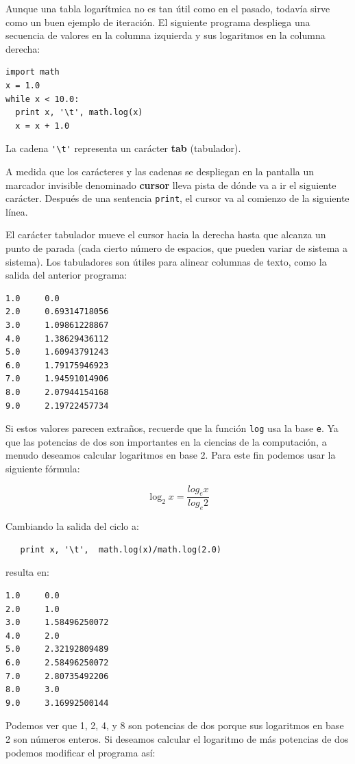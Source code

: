 
Aunque una tabla logarítmica no es tan útil como en el pasado, todavía
sirve como un buen ejemplo de iteración. El siguiente programa
despliega una secuencia de valores en la columna izquierda y sus
logaritmos en la columna derecha:

\beforeverb
\begin{verbatim}
import math
x = 1.0
while x < 10.0:
  print x, '\t', math.log(x)
  x = x + 1.0
\end{verbatim}
\afterverb
%
La cadena
\verb+'\t'+ representa un carácter {\bf tab} (tabulador).

A medida que los carácteres y las cadenas se despliegan en 
la pantalla un marcador invisible denominado  {\bf cursor} 
lleva pista de dónde va a ir el siguiente carácter.  Después
de una sentencia \texttt{print}, el cursor va al comienzo de la
siguiente línea.

El carácter tabulador mueve el cursor hacia la derecha hasta que 
alcanza un punto de parada (cada cierto número de espacios, que
pueden variar de sistema a sistema). Los tabuladores son útiles
para alinear columnas de texto, como la salida del anterior
programa:

\beforeverb
\begin{verbatim}
1.0     0.0
2.0     0.69314718056
3.0     1.09861228867
4.0     1.38629436112
5.0     1.60943791243
6.0     1.79175946923
7.0     1.94591014906
8.0     2.07944154168
9.0     2.19722457734
\end{verbatim}
\afterverb
%
Si estos valores parecen extraños, recuerde que la función  \texttt{log} usa
la base \texttt{e}. Ya que las potencias de dos son importantes en la 
ciencias de la computación, a menudo deseamos calcular logaritmos en
base 2.  Para este fin podemos usar la siguiente fórmula:

\begin{equation}
\log_2 x = \frac {log_e x}{log_e 2}
\end{equation}

Cambiando la salida del ciclo a:

\beforeverb
\begin{verbatim}
   print x, '\t',  math.log(x)/math.log(2.0)
\end{verbatim}
\afterverb
%
resulta en:

\beforeverb
\begin{verbatim}
1.0     0.0
2.0     1.0
3.0     1.58496250072
4.0     2.0
5.0     2.32192809489
6.0     2.58496250072
7.0     2.80735492206
8.0     3.0
9.0     3.16992500144
\end{verbatim}
\afterverb
%
Podemos ver que  1, 2, 4, y 8 son potencias de dos porque sus
logaritmos en base 2 son números enteros. Si deseamos 
calcular el logaritmo de más potencias de dos podemos
modificar el programa así:

